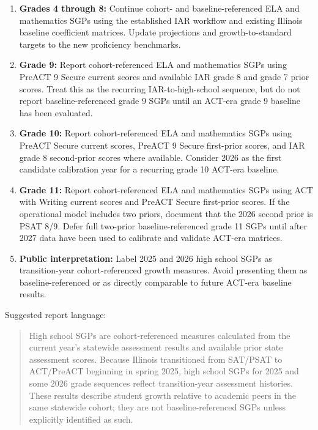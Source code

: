 \documentclass[11pt]{article}
\begin{document}
\begin{enumerate}
\item \textbf{Grades 4 through 8:} Continue cohort- and baseline-referenced ELA and mathematics SGPs using the established IAR workflow and existing Illinois baseline coefficient matrices. Update projections and growth-to-standard targets to the new proficiency benchmarks.

\item \textbf{Grade 9:} Report cohort-referenced ELA and mathematics SGPs using PreACT 9 Secure current scores and available IAR grade 8 and grade 7 prior scores. Treat this as the recurring IAR-to-high-school sequence, but do not report baseline-referenced grade 9 SGPs until an ACT-era grade 9 baseline has been evaluated.

\item \textbf{Grade 10:} Report cohort-referenced ELA and mathematics SGPs using PreACT Secure current scores, PreACT 9 Secure first-prior scores, and IAR grade 8 second-prior scores where available. Consider 2026 as the first candidate calibration year for a recurring grade 10 ACT-era baseline.

\item \textbf{Grade 11:} Report cohort-referenced ELA and mathematics SGPs using ACT with Writing current scores and PreACT Secure first-prior scores. If the operational model includes two priors, document that the 2026 second prior is PSAT 8/9. Defer full two-prior baseline-referenced grade 11 SGPs until after 2027 data have been used to calibrate and validate ACT-era matrices.

\item \textbf{Public interpretation:} Label 2025 and 2026 high school SGPs as transition-year cohort-referenced growth measures. Avoid presenting them as baseline-referenced or as directly comparable to future ACT-era baseline results.
\end{enumerate}

Suggested report language:

\begin{quote}
\small
High school SGPs are cohort-referenced measures calculated from the current year's statewide assessment results and available prior state assessment scores. Because Illinois transitioned from SAT/PSAT to ACT/PreACT beginning in spring 2025, high school SGPs for 2025 and some 2026 grade sequences reflect transition-year assessment histories. These results describe student growth relative to academic peers in the same statewide cohort; they are not baseline-referenced SGPs unless explicitly identified as such.
\end{quote}
\end{document}
